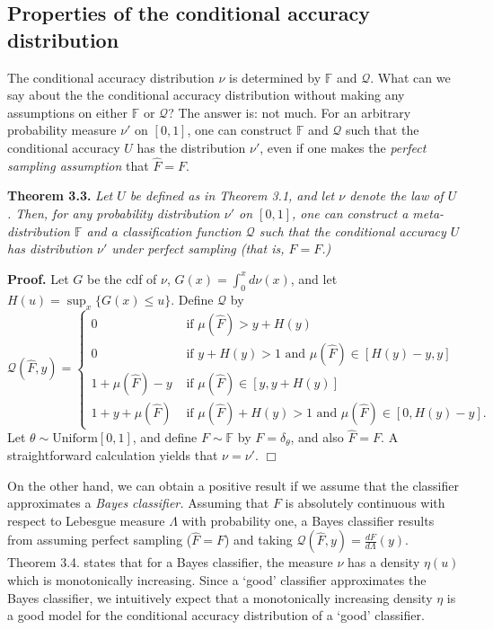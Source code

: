 \documentclass{article}
\begin{document}
\subsection{Properties of the conditional accuracy distribution}

The conditional accuracy distribution $\nu$ is determined by $\mathbb{F}$
and $\mathcal{Q}$.  What can we say about the the conditional accuracy
distribution without making any assumptions on either $\mathbb{F}$ or
$\mathcal{Q}$?  The answer is: not much.  For an arbitrary probability
measure $\nu'$ on $[0,1]$, one can construct $\mathbb{F}$ and
$\mathcal{Q}$ such that the conditional accuracy $U$ has the distribution $\nu'$, even if one makes the \emph{perfect sampling assumption} that $\hat{F}=F.$

\noindent\textbf{Theorem 3.3.} \emph{ Let $U$ be defined as in Theorem
  3.1, and let $\nu$ denote the law of $U$.  Then, for any probability
  distribution $\nu'$ on $[0,1]$, one can construct a
  meta-distribution $\mathbb{F}$ and a classification function $\mathcal{Q}$ such
  that the conditional accuracy $U$ has distribution $\nu'$ under perfect sampling (that is, $\hat{F} = F$.)  }

\textbf{Proof.}  
Let $G$ be the cdf of $\nu$, $G(x) = \int_0^x d\nu(x)$, and let $H(u) = \sup_x \{G(x) \leq u\}$.
Define $\mathcal{Q}$ by
\[
\mathcal{Q}(\hat{F}, y) = \begin{cases}
0 &\text{ if }\mu(\hat{F}) > y + H(y)\\
0 & \text{ if }y + H(y) > 1 \text{ and }\mu(\hat{F}) \in [H(y) - y, y]\\
1 + \mu(\hat{F}) - y &\text{ if } \mu(\hat{F}) \in [y, y + H(y)]\\
1 + y + \mu(\hat{F}) &\text{ if }\mu(\hat{F}) + H(y) > 1 \text{ and }\mu(\hat{F}) \in [0, H(y) - y]. 
\end{cases}
\]
Let $\theta \sim \text{Uniform}[0,1]$,
and define $F \sim \mathbb{F}$ by $F = \delta_\theta$, and also $\hat{F} = F.$
A straightforward calculation yields that $\nu = \nu'$. $\Box$

On the other hand, we can obtain a positive result if we assume that
the classifier approximates a \emph{Bayes classifier.}
Assuming that $F$ is absolutely continuous with respect to Lebesgue measure $\Lambda$ with probability one,
a Bayes classifier results from assuming perfect sampling ($\hat{F} = F$) and taking
$\mathcal{Q}(\hat{F}, y) = \frac{dF}{d\Lambda}(y)$.
Theorem 3.4. states that for a Bayes classifier, the measure $\nu$ has a density $\eta(u)$ which is monotonically increasing.
Since a `good' classifier approximates the Bayes classifier, we intuitively expect that a monotonically
increasing density $\eta$ is a good model for the conditional accuracy distribution of a `good' classifier.
\end{document}
